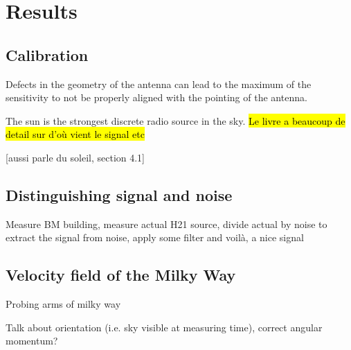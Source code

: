 \section{Results}
\subsection{Calibration}
Defects in the geometry of the antenna can lead to the maximum of the sensitivity to not be properly aligned with the pointing of the antenna.


The sun is the strongest discrete radio source in the sky\cite{burke_introduction_2013}. \hl{Le livre a beaucoup de detail sur d'où vient le signal etc}

[aussi \cite{lauterbach_radio_2022} parle du soleil, section 4.1]

\subsection{Distinguishing signal and noise}
Measure BM building, measure actual H21 source, divide actual by noise to extract the signal from noise, apply some filter and voilà, a nice signal

\subsection{Velocity field of the Milky Way}
Probing arms of milky way

Talk about orientation (i.e. sky visible at measuring time), correct angular momentum?
